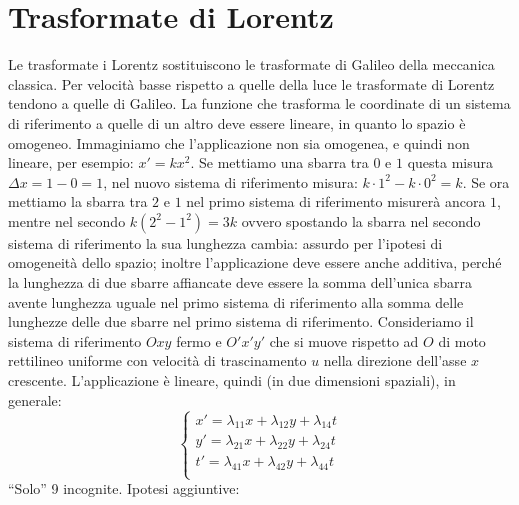 \section{Trasformate di Lorentz}
Le trasformate i Lorentz sostituiscono le trasformate di Galileo della meccanica classica. Per velocità basse rispetto a quelle della luce le trasformate di Lorentz tendono a quelle di Galileo.
La funzione che trasforma le coordinate di un sistema di riferimento a quelle di un altro deve essere lineare, in quanto lo spazio è omogeneo. Immaginiamo che l'applicazione non sia omogenea, e quindi non lineare, per esempio: $x'=kx^2$. Se mettiamo una sbarra tra $0$ e $1$ questa misura $\Delta x=1-0=1$, nel nuovo sistema di riferimento misura: $k\cdot 1^2-k\cdot 0^2=k$. Se ora mettiamo la sbarra tra $2$ e $1$ nel primo sistema di riferimento misurerà ancora $1$, mentre nel secondo $k(2^2-1^2)=3k$ ovvero spostando la sbarra nel secondo sistema di riferimento la sua lunghezza cambia: assurdo per l'ipotesi di omogeneità dello spazio; inoltre l'applicazione deve essere anche additiva, perché la lunghezza di due sbarre affiancate deve essere la somma dell'unica sbarra avente lunghezza uguale nel primo sistema di riferimento alla somma delle lunghezze delle due sbarre nel primo sistema di riferimento. Consideriamo il sistema di riferimento $Oxy$ fermo e $O'x'y'$ che si muove rispetto ad $O$ di moto rettilineo uniforme con velocità di trascinamento $u$ nella direzione dell'asse $x$ crescente. L'applicazione è lineare, quindi (in due dimensioni spaziali), in generale:
\begin{equation*}\left\{
\begin{array}{l}
x'=\lambda_{11}x+\lambda_{12}y+\lambda_{14}t\\
y'=\lambda_{21}x+\lambda_{22}y+\lambda_{24}t\\
t'=\lambda_{41}x+\lambda_{42}y+\lambda_{44}t\\\end{array}\right.
\end{equation*}
``Solo'' 9 incognite. Ipotesi aggiuntive:
